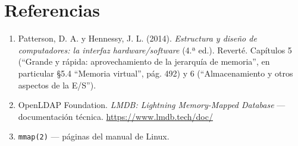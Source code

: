 \documentclass[12pt, letterpaper]{article}
\begin{document}
\section{Referencias}

\begin{enumerate}
    \item Patterson, D. A. y Hennessy, J. L. (2014). \emph{Estructura y
    diseño de computadores: la interfaz hardware/software} (4.ª ed.).
    Reverté. Capítulos 5 (``Grande y rápida: aprovechamiento de la jerarquía
    de memoria'', en particular §5.4 ``Memoria virtual'', pág. 492) y 6
    (``Almacenamiento y otros aspectos de la E/S'').
    \item OpenLDAP Foundation. \emph{LMDB: Lightning Memory-Mapped Database}
    --- documentación técnica. \url{https://www.lmdb.tech/doc/}
    \item \texttt{mmap(2)} --- páginas del manual de Linux.
\end{enumerate}
\end{document}

